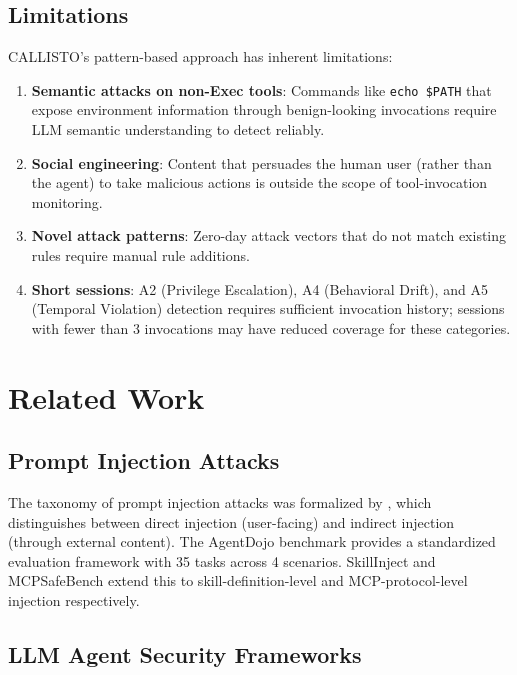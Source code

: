 \documentclass[10pt,conference]{IEEEtran}
\begin{document}
\subsection{Limitations}

CALLISTO's pattern-based approach has inherent limitations:

\begin{enumerate}
    \item \textbf{Semantic attacks on non-Exec tools}: Commands like \texttt{echo \$PATH} that expose environment information through benign-looking invocations require LLM semantic understanding to detect reliably.
    \item \textbf{Social engineering}: Content that persuades the human user (rather than the agent) to take malicious actions is outside the scope of tool-invocation monitoring.
    \item \textbf{Novel attack patterns}: Zero-day attack vectors that do not match existing rules require manual rule additions.
    \item \textbf{Short sessions}: A2 (Privilege Escalation), A4 (Behavioral Drift), and A5 (Temporal Violation) detection requires sufficient invocation history; sessions with fewer than 3 invocations may have reduced coverage for these categories.
\end{enumerate}

\section{Related Work}

\subsection{Prompt Injection Attacks}

The taxonomy of prompt injection attacks was formalized by \cite{agentdojo}, which distinguishes between direct injection (user-facing) and indirect injection (through external content). The AgentDojo benchmark provides a standardized evaluation framework with 35 tasks across 4 scenarios. SkillInject \cite{skillinject} and MCPSafeBench \cite{mcpsafebench} extend this to skill-definition-level and MCP-protocol-level injection respectively.

\subsection{LLM Agent Security Frameworks}
\end{document}
